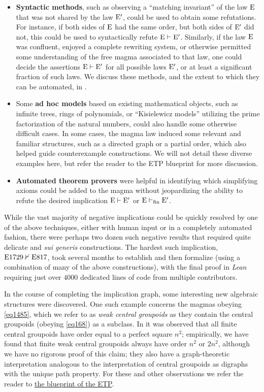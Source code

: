 \begin{itemize}
        \item \textbf{Syntactic methods}, such as observing a ``matching invariant'' of the law $\mathrm{E}$ that was not shared by the law ${\mathrm{E}'}$, could be used to obtain some refutations.  For instance, if both sides of $\mathrm{E}$ had the same order, but both sides of ${\mathrm{E}'}$ did not, this could be used to syntactically refute ${\mathrm{E}} \vdash {\mathrm{E}'}$.  Similarly, if the law $\mathrm{E}$ was confluent, enjoyed a complete rewriting system, or otherwise permitted some understanding of the free magma associated to that law, one could decide the assertions ${\mathrm{E}} \vdash {\mathrm{E}'}$ for all possible laws ${\mathrm{E}'}$, or at least a significant fraction of such laws.  We discuss these methods, and the extent to which they can be automated, in .
        \item Some \textbf{ad hoc models} based on existing mathematical objects, such as infinite trees, rings of polynomials, or ``Kisielewicz models'' utilizing the prime factorization of the natural numbers, could also handle some otherwise difficult cases.  In some cases, the magma law induced some relevant and familiar structures, such as a directed graph or a partial order, which also helped guide counterexample constructions. We will not detail these diverse examples here, but refer the reader to the ETP blueprint for more discussion.
        \item \textbf{Automated theorem provers} were helpful in identifying which simplifying axioms could be added to the magma without jeopardizing the ability to refute the desired implication ${\mathrm{E}} \vdash {\mathrm{E}'}$ or ${\mathrm{E}} \vdash_{\mathrm{fin}} {\mathrm{E}'}$.
\end{itemize}

While the vast majority of negative implications could be quickly resolved by one of the above techniques, either with human input or in a completely automated fashion, there were perhaps two dozen such negative results that required quite delicate and \emph{sui generis} constructions.  The hardest such implication, $\mathrm{E}1729 \nvdash \mathrm{E}817$, took several months to establish and then formalize (using a combination of many of the above constructions), with the final proof in \emph{Lean} requiring just over $\num{4000}$ dedicated lines of code from multiple contributors.

In the course of completing the implication graph, some interesting new algebraic structures were discovered.  One such example concerns the magmas obeying \eqref{eq1485}, which we refer to as \emph{weak central groupoids} as they contain the central groupoids (obeying \eqref{eq168}) as a subclass.  In \cite{knuth} it was observed that all finite central groupoids have order equal to a perfect square $n^2$; empirically, we have found that finite weak central groupoids always have order $n^2$ or $2n^2$, although we have no rigorous proof of this claim; they also have a graph-theoretic interpretation analogous to the interpretation of central groupoids as digraphs with the unique path property.  For these and other observations we refer the reader to \href{https://teorth.github.io/equational_theories/blueprint/weak-central-groupoids-chapter.html}{the blueprint of the ETP}.

